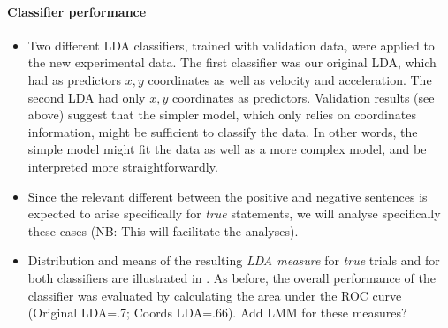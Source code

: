 \documentclass{article}
\newcommand{\addMM}[1]{{\leavevmode\color{red}#1}}
\begin{document}
\paragraph{Classifier performance}
\begin{itemize}

\item Two different LDA classifiers, trained with validation data, were applied to the new experimental data. The first classifier was our original LDA, which had as predictors $x,y$ coordinates as well as velocity and acceleration. The second LDA had only $x,y$ coordinates as predictors. Validation results (see above) suggest that the simpler model, which only relies on coordinates information, might be sufficient to classify the data. In other words, the simple model might fit the data as well as a more complex model, and be interpreted more straightforwardly. 

\item Since the relevant different between the positive and negative sentences is expected to arise specifically for \emph{true} statements, we will analyse specifically these cases (NB: This will facilitate the analyses).  

\item Distribution and means of the resulting \textit{LDA measure} for \emph{true} trials and for both classifiers are illustrated in . As before, the overall performance of the classifier was evaluated by calculating the area under the ROC curve (Original LDA=.7; Coords LDA=.66). \addMM{Add LMM for these measures?}


\end{itemize}
\end{document}
